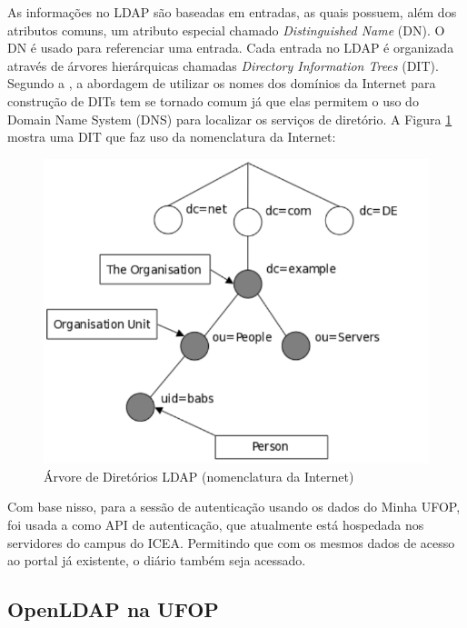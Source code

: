 \documentclass[
  12pt,       %
  openright,      %
  oneside,      %
  a4paper,      %
  english,      %
  french,        %
  spanish,     %
  brazil        %
  ]{abntex2-decsi}
\begin{document}
        As informações no LDAP são baseadas em entradas, as quais possuem, além dos atributos comuns, um atributo especial chamado \textit{Distinguished Name} (DN). O DN é usado para referenciar uma entrada. Cada entrada no LDAP é organizada através de árvores hierárquicas chamadas \textit{Directory Information Trees} (DIT). Segundo a , a abordagem de utilizar os nomes dos domínios da Internet para construção de DITs tem se tornado comum já que elas permitem o uso do Domain Name System (DNS) para localizar os serviços de diretório. A Figura \ref{fig:ldap_tree} mostra uma DIT que faz uso da nomenclatura da Internet:

        \begin{figure}[h]
           \centering
           \caption{Árvore de Diretórios LDAP (nomenclatura da Internet)}\label{fig:ldap_tree}
           \includegraphics[scale=0.6]{img/ldap_tree}
        \end{figure}
        
        
Com base nisso, para a sessão de autenticação usando os dados do Minha UFOP, foi usada a \cite{API-LDAP} como API de autenticação, que atualmente está hospedada nos servidores do campus do ICEA. Permitindo que com os mesmos dados de acesso ao portal já existente, o diário também seja acessado.

        \subsection{OpenLDAP na UFOP}
\end{document}
